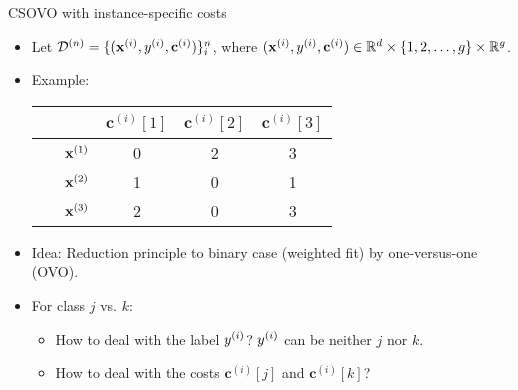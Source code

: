 \documentclass[11pt,compress,t,notes=noshow, xcolor=table]{beamer}
\newcommand{\cv}{\mathbf{c}}    %
\begin{document}
\begin{vbframe}{CSOVO with instance-specific costs}
    \footnotesize
    \begin{itemize}
        \footnotesize

        \item Let $\D^{(n)} = \{(\xi, \yi, \cv^{(i)})\}_i^n$, where $(\xi, \yi, \cv^{(i)}) \in \mathbb{R}^d \times \{1, 2, \ldots, g\} \times \mathbb{R}^g$. 
        \vspace{5pt}    
        \item Example:
        \vspace{5pt}

                        \begin{center}
                            \begin{tabular}{cc|ccc}\
        			& & $\cv^{(i)}[1]$ & $\cv^{(i)}[2]$ & $\cv^{(i)}[3]$  \\
        			\hline & $\mathbf{x}^{(1)}$ & 0 & 2 & 3\\
        			& $\mathbf{x}^{(2)}$ & 1 & 0 & 1\\
                 	& $\mathbf{x}^{(3)}$ & 2 & 0 & 3\\
                \end{tabular}
        \end{center}
        
        \vspace{5pt}
        \vspace{5pt}
        
        \item Idea: Reduction principle to binary case (weighted fit) by one-versus-one (OVO). 
        
        \vspace{5pt}
        
        \item For class $j$ vs. $k$:
        \begin{itemize}
            \footnotesize
            \item How to deal with the label $y^{(i)}$? $y^{(i)}$ can be neither $j$ nor $k$.
            \vspace{5pt}
            
            \item How to deal with the costs $\cv^{(i)}[j]$ and $\cv^{(i)}[k]$?
        \end{itemize}
            
    \end{itemize}
\end{vbframe}
\end{document}
